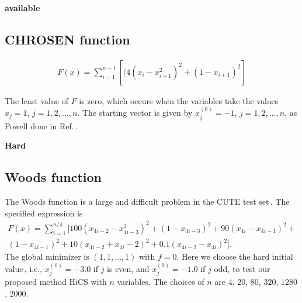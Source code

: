 \documentclass[final,1p,times]{elsarticle}
\begin{document}
\textbf{available}

\subsection{CHROSEN function}
\label{subsec:CHROSEN}

\begin{align}
	F(x) = \sum_{i=1}^{n-1}[(4(x_i-x_{i+1}^2)^2 + (1-x_{i+1})^2]
	\label{} \end{align}

The least value of $F$ is zero, which occurs when the variables take the values
$x_j=1$, $j=1,2,\dots,n$.
The starting vector is given by $x_j^{(0)}=-1$, $j=1,2,\dots,n$, as
Powell done in Ref.\,\cite{powell2006newuoa}. 

\textbf{Hard}


\subsection{Woods function\,\cite{lukvsan2010modified, algopy}}
\label{subsec:woods}

The Woods function is a large and difficult problem in the CUTE test
set\,\cite{lukvsan2010modified}. The specified expression is  
\begin{equation}
	\begin{aligned}
		F(x) = \sum^{n/4}_{i=1} \Big[100(x_{4i-2}-x^2_{4i-3})^2 +
		(1-x_{4i-3})^2 + 90(x_{4i}-x_{4i-1})^2 +
		\\
		(1-x_{4i-1})^2 + 10(x_{4i-2}+x_{4i}-2)^2 +
		0.1(x_{4i-2}-x_{4i})^2
		\Big].
	\end{aligned}
	\label{eq:woods}
\end{equation}
The global minimizer is $(1,1,\dots,1)$ with $f=0$.
Here we choose the hard initial value\,\cite{}, i.e., $x_j^{(0)}=-3.0$ if
$j$ is even, and  $x_j^{(0)}=-1.0$ if $j$ odd, to test our
proposed method HiCS with $n$ variables. The choices of $n$ are
$4$, $20$, $80$, $320$, $1280$, $2000$. 
\end{document}
